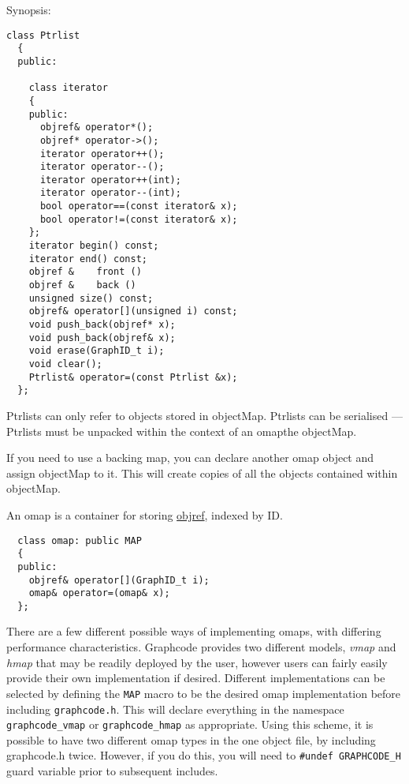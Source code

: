 Synopsis:

\begin{verbatim}
class Ptrlist 
  {
  public:
    
    class iterator
    {
    public:
      objref& operator*();
      objref* operator->();
      iterator operator++();
      iterator operator--();
      iterator operator++(int);
      iterator operator--(int);
      bool operator==(const iterator& x);
      bool operator!=(const iterator& x);
    };
    iterator begin() const;
    iterator end() const;
    objref &    front ()
    objref &    back ()
    unsigned size() const;
    objref& operator[](unsigned i) const; 
    void push_back(objref* x);
    void push_back(objref& x);
    void erase(GraphID_t i);
    void clear();
    Ptrlist& operator=(const Ptrlist &x);
  };
\end{verbatim}

Ptrlists can only refer to objects stored in objectMap.
Ptrlists can be serialised --- Ptrlists must be unpacked within the
context of an omapthe objectMap.

If you need to use a backing map, you can declare another omap object
and assign objectMap to it. This will create copies of all the objects
contained within objectMap.

\label{omap}

An omap is a container for storing \hyperref{{\em objrefs}}{
  \S(}{)}{objref}, indexed by ID.

\begin{verbatim}
  class omap: public MAP
  {
  public:
    objref& operator[](GraphID_t i);
    omap& operator=(omap& x);
  };
\end{verbatim}

There are a few different possible ways of implementing omaps, with
differing performance characteristics.  Graphcode provides two
different models, {\em vmap} and {\em hmap} that may be readily
deployed by the user, however users can fairly easily provide their
own implementation if desired. Different implementations can be
selected by defining the \verb+MAP+ macro to be the desired
omap implementation before including \verb+graphcode.h+. This will
declare everything in the namespace
\verb+graphcode_vmap+ or
\verb+graphcode_hmap+ as appropriate. Using
this scheme, it is possible to have two different omap types in the
one object file, by including graphcode.h twice. However, if you do
this, you will need to \verb+#undef GRAPHCODE_H+ guard variable prior
to subsequent includes.

